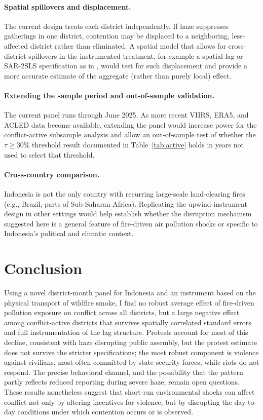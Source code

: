 \documentclass[12pt]{article}
\begin{document}
\paragraph{Spatial spillovers and displacement.} The current design treats each district independently. If haze suppresses gatherings in one district, contention may be displaced to a neighboring, less-affected district rather than eliminated. A spatial model that allows for cross-district spillovers in the instrumented treatment, for example a spatial-lag or SAR-2SLS specification as in \citet{lu2023fish}, would test for such displacement and provide a more accurate estimate of the aggregate (rather than purely local) effect.

\paragraph{Extending the sample period and out-of-sample validation.} The current panel runs through June 2025. As more recent VIIRS, ERA5, and ACLED data become available, extending the panel would increase power for the conflict-active subsample analysis and allow an out-of-sample test of whether the $\tau \geq 30\%$ threshold result documented in Table~\ref{tab:active} holds in years not used to select that threshold.

\paragraph{Cross-country comparison.} Indonesia is not the only country with recurring large-scale land-clearing fires (e.g., Brazil, parts of Sub-Saharan Africa). Replicating the upwind-instrument design in other settings would help establish whether the disruption mechanism suggested here is a general feature of fire-driven air pollution shocks or specific to Indonesia's political and climatic context.

\section{Conclusion}
\label{sec:conclusion}

Using a novel district-month panel for Indonesia and an instrument based on the physical transport of wildfire smoke, I find no robust average effect of fire-driven pollution exposure on conflict across all districts, but a large negative effect among conflict-active districts that survives spatially correlated standard errors and full instrumentation of the lag structure. Protests account for most of this decline, consistent with haze disrupting public assembly, but the protest estimate does not survive the stricter specifications; the most robust component is violence against civilians, most often committed by state security forces, while riots do not respond. The precise behavioral channel, and the possibility that the pattern partly reflects reduced reporting during severe haze, remain open questions. These results nonetheless suggest that short-run environmental shocks can affect conflict not only by altering incentives for violence, but by disrupting the day-to-day conditions under which contention occurs or is observed.
\end{document}

